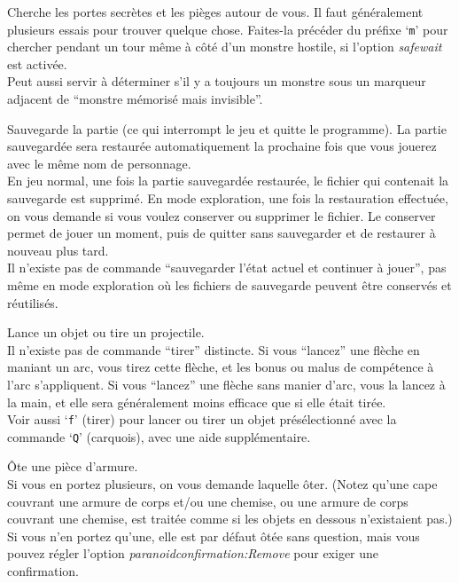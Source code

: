 \documentclass[titlepage]{article}
\begin{document}
\begin{description}[font=\mdseries\ttfamily]
\item[s]
Cherche les portes secrètes et les pièges autour de vous.
Il faut généralement plusieurs essais pour trouver quelque chose.
Faites-la précéder du préfixe `\texttt{m}' pour chercher pendant un tour
même à côté d'un monstre hostile, si l'option \textit{safe\textunderscore wait}
est activée.\\
Peut aussi servir à déterminer s'il y a toujours un monstre sous un
marqueur adjacent de ``monstre mémorisé mais invisible''.
\item[S]
Sauvegarde la partie (ce qui interrompt le jeu et quitte le programme).
La partie sauvegardée sera restaurée automatiquement la prochaine fois que
vous jouerez avec le même nom de personnage.\\
En jeu normal, une fois la partie sauvegardée restaurée, le fichier
qui contenait la sauvegarde est supprimé.
En mode exploration, une fois la restauration effectuée, on vous demande si
vous voulez conserver ou supprimer le fichier.
Le conserver permet de jouer un moment, puis de quitter
sans sauvegarder et de restaurer à nouveau plus tard.\\
Il n'existe pas de commande ``sauvegarder l'état actuel et continuer à jouer'',
pas même en mode exploration où les fichiers de sauvegarde peuvent être conservés et réutilisés.
\item[t]
Lance un objet ou tire un projectile.\\
Il n'existe pas de commande ``tirer'' distincte.
Si vous ``lancez'' une flèche en maniant un arc, vous tirez
cette flèche, et les bonus ou malus de compétence à l'arc s'appliquent.
Si vous ``lancez'' une flèche sans manier d'arc, vous la lancez
à la main, et elle sera généralement moins efficace que si elle était tirée.\\
Voir aussi `\texttt{f}' (tirer) pour lancer ou tirer un objet présélectionné
avec la commande `\texttt{Q}' (carquois), avec une aide supplémentaire.
\item[T]
Ôte une pièce d'armure.\\
Si vous en portez plusieurs, on vous demande laquelle
ôter.  (Notez qu'une cape couvrant une armure de corps
et/ou une chemise, ou une armure de corps couvrant une chemise, est traitée
comme si les objets en dessous n'existaient pas.)
Si vous n'en portez qu'une, elle est par défaut
ôtée sans question, mais vous pouvez régler l'option
\textit{paranoid\textunderscore confirmation:Remove}
pour exiger une confirmation.\\

\end{description}
\end{document}
